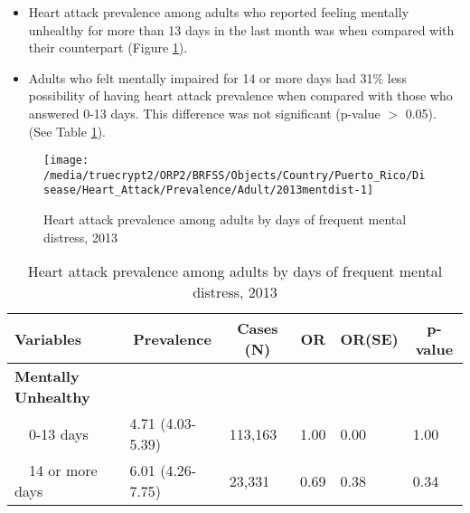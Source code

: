  \newpage
\begin{itemize}

\item Heart attack prevalence among adults who reported feeling mentally unhealthy for more than 13 days in the last month was  when compared with their counterpart (Figure \ref{fig:mental.Heart_Attack.2013}).


\item  Adults who felt mentally impaired for 14 or more days had 31\% less possibility of having heart attack prevalence when compared with those who answered 0-13 days. This difference was not significant (p-value $>$ 0.05). (See Table \ref{tab:mental.Heart_Attack.2013}).

\end{itemize}

\begin{figure}[H]
\centering
\caption{Heart attack prevalence among adults by days of frequent mental distress, 2013}
\label{fig:mental.Heart_Attack.2013}

\begin{knitrout}
\color{fgcolor}

{\centering \texttt{[image: /media/truecrypt2/ORP2/BRFSS/Objects/Country/Puerto\_Rico/Disease/Heart\_Attack/Prevalence/Adult/2013mentdist-1]} 

}



\end{knitrout}
 \end{figure}

\begin{table}[H]
\caption{Heart attack prevalence among adults by days of frequent mental distress, 2013\label{tab:mental.Heart_Attack.2013}} 
\begin{center}
\begin{tabular}{llllll}
\hline\hline
\multicolumn{1}{l}{Variables}&\multicolumn{1}{c}{Prevalence}&\multicolumn{1}{c}{Cases (N)}&\multicolumn{1}{c}{OR}&\multicolumn{1}{c}{OR(SE)}&\multicolumn{1}{c}{p-value}\tabularnewline
\hline
{\bfseries Mentally Unhealthy}&&&&&\tabularnewline
~~0-13 days&4.71 (4.03-5.39)&113,163&1.00&0.00&1.00\tabularnewline
~~14 or more days&6.01 (4.26-7.75)& 23,331&0.69&0.38&0.34\tabularnewline
\hline
\end{tabular}\end{center}

\end{table}



